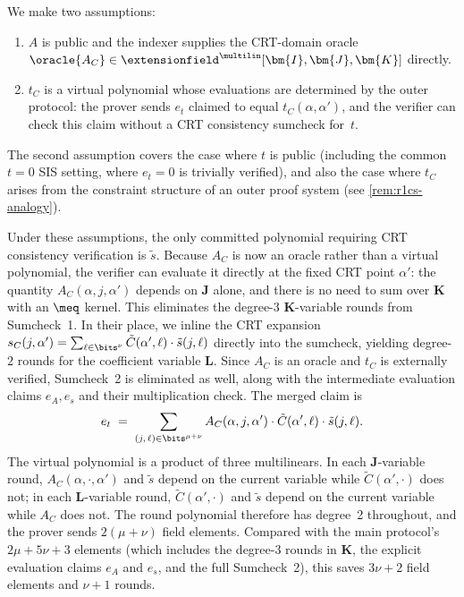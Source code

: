 We make two assumptions:
\begin{enumerate}[nosep]
    \item $A$ is public and the indexer supplies the CRT-domain oracle $\oracle{A_C} \in \extensionfield^{\multilin}[\bm{I},\bm{J},\bm{K}]$ directly.
    \item $t_C$ is a virtual polynomial whose evaluations are determined by the outer protocol: the prover sends $e_t$ claimed to equal $t_C(\alpha, \alpha')$, and the verifier can check this claim without a CRT consistency sumcheck for~$t$.
\end{enumerate}
The second assumption covers the case where $t$ is public (including the common $t = 0$ SIS setting, where $e_t = 0$ is trivially verified), and also the case where $t_C$ arises from the constraint structure of an outer proof system (see \cref{rem:r1cs-analogy}).

Under these assumptions, the only committed polynomial requiring CRT consistency verification is $\tilde{s}$. Because $A_C$ is now an oracle rather than a virtual polynomial, the verifier can evaluate it directly at the fixed CRT point $\alpha'$: the quantity $A_C(\alpha, j, \alpha')$ depends on $\bm{J}$ alone, and there is no need to sum over $\bm{K}$ with an $\meq$ kernel. This eliminates the degree-$3$ $\bm{K}$-variable rounds from Sumcheck~1. In their place, we inline the CRT expansion $s_C(j, \alpha') = \sum_{\ell \in \bits^\nu} \tilde{C}(\alpha', \ell) \cdot \tilde{s}(j, \ell)$ directly into the sumcheck, yielding degree-$2$ rounds for the coefficient variable $\bm{L}$. Since $A_C$ is an oracle and $t_C$ is externally verified, Sumcheck~2 is eliminated as well, along with the intermediate evaluation claims $e_A, e_s$ and their multiplication check. The merged claim is
\begin{equation}\label{eq:merged-sumcheck}
    e_t \;=\; \sum_{(j,\, \ell) \in \bits^{\mu + \nu}} A_C(\alpha, j, \alpha') \cdot \tilde{C}(\alpha', \ell) \cdot \tilde{s}(j, \ell).
\end{equation}
The virtual polynomial is a product of three multilinears. In each $\bm{J}$-variable round, $A_C(\alpha, \cdot, \alpha')$ and $\tilde{s}$ depend on the current variable while $\tilde{C}(\alpha', \cdot)$ does not; in each $\bm{L}$-variable round, $\tilde{C}(\alpha', \cdot)$ and $\tilde{s}$ depend on the current variable while $A_C$ does not. The round polynomial therefore has degree~2 throughout, and the prover sends $2(\mu + \nu)$ field elements. Compared with the main protocol's $2\mu + 5\nu + 3$ elements (which includes the degree-$3$ rounds in $\bm{K}$, the explicit evaluation claims $e_A$ and $e_s$, and the full Sumcheck~2), this saves $3\nu + 2$ field elements and $\nu+1$ rounds.

